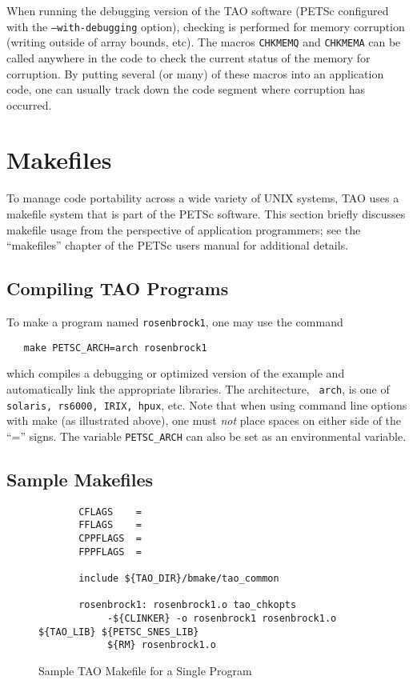 \noindent
When running the debugging version of the TAO software (PETSc configured 
with the \texttt{--with-debugging} option), checking is performed for 
memory corruption
(writing outside of array bounds, etc). The macros \texttt{CHKMEMQ} and
\texttt{CHKMEMA} can be called anywhere in the code to check the current
status of the memory for corruption.  By putting several (or many) of
these macros into an application code, one can usually track
down the code segment where corruption has occurred.

\section{Makefiles}
\label{sec:makefiles}

To manage code portability across a wide variety of UNIX systems, TAO
uses a makefile system that is part of the PETSc software.  This
section briefly discusses makefile usage from the perspective of
application programmers; see the ``makefiles'' chapter of the PETSc
users manual for additional details.

\subsection*{Compiling TAO Programs}

To make a program named \texttt{rosenbrock1}, one may use the command
\begin{verbatim}
   make PETSC_ARCH=arch rosenbrock1
\end{verbatim}
\noindent
which compiles a debugging or optimized version of the example and
automatically link the appropriate libraries.  The architecture, {\tt
  arch}, is one of \texttt{solaris, rs6000, IRIX, hpux}, etc. Note that
when using command line options with make (as illustrated above), one
must {\em not} place spaces on either side of the ``='' signs.  The
variable \texttt{PETSC\_ARCH} can also be set as an
environmental variable.

\subsection*{Sample Makefiles}

\begin{figure}[tbh]
{\footnotesize
\begin{verbatim}   
       CFLAGS    = 
       FFLAGS    = 
       CPPFLAGS  =
       FPPFLAGS  =
       
       include ${TAO_DIR}/bmake/tao_common
   
       rosenbrock1: rosenbrock1.o tao_chkopts
            -${CLINKER} -o rosenbrock1 rosenbrock1.o ${TAO_LIB} ${PETSC_SNES_LIB}
            ${RM} rosenbrock1.o
\end{verbatim} 
}
\caption{Sample TAO Makefile for a Single Program}
\label{fig:make1}
\end{figure}

